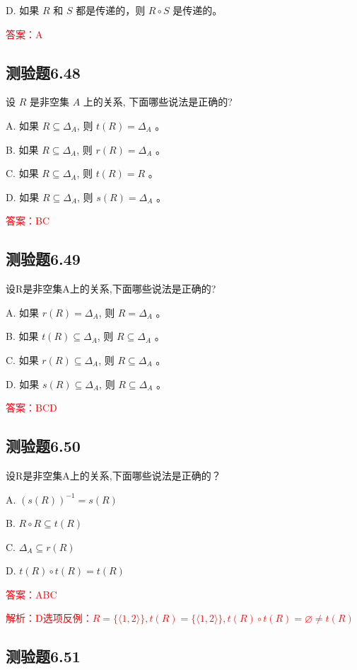 \documentclass[UTF8, heading=true]{ctexart}
\begin{document}
D. 
如果 $R$ 和 $S$ 都是传递的，则 $R \circ S$ 是传递的。

\textcolor{red}{答案：A}

\subsection{测验题6.48}

设 $R$ 是非空集 $A$ 上的关系, 下面哪些说法是正确的?

A. 如果 $R \subseteq \Delta_A$, 则 $t(R)=\Delta_A$ 。

B. 
如果 $R \subseteq \Delta_A$, 则 $r(R)=\Delta_A$ 。

C. 
如果 $R \subseteq \Delta_A$, 则 $t(R)=R$ 。

D. 
如果 $R \subseteq \Delta_A$, 则 $s(R)=\Delta_A$ 。

\textcolor{red}{答案：BC}

\subsection{测验题6.49}
设R是非空集A上的关系,下面哪些说法是正确的?

A. 如果 $r(R)=\Delta_A$, 则 $R=\Delta_A$ 。

B. 如果 $t(R) \subseteq \Delta_A$, 则 $R \subseteq \Delta_A$ 。

C. 如果 $r(R) \subseteq \Delta_A$, 则 $R \subseteq \Delta_A$ 。

D. 如果 $s(R) \subseteq \Delta_A$, 则 $R \subseteq \Delta_A$ 。

\textcolor{red}{答案：BCD}

\subsection{测验题6.50}

设R是非空集A上的关系,下面哪些说法是正确的？

A. $(s(R))^{-1}=s(R)$

B. $R \circ R \subseteq t(R)$

C. $\Delta_A \subseteq r(R)$

D. $t(R) \circ t(R)=t(R)$

\textcolor{red}{答案：ABC}

\textcolor{red}{解析：D选项反例：$R=\{\langle 1,2\rangle \}, t(R)=\{\langle 1,2\rangle \}, t(R) \circ t(R)= \varnothing \neq t(R)$}

\subsection{测验题6.51}
\end{document}
